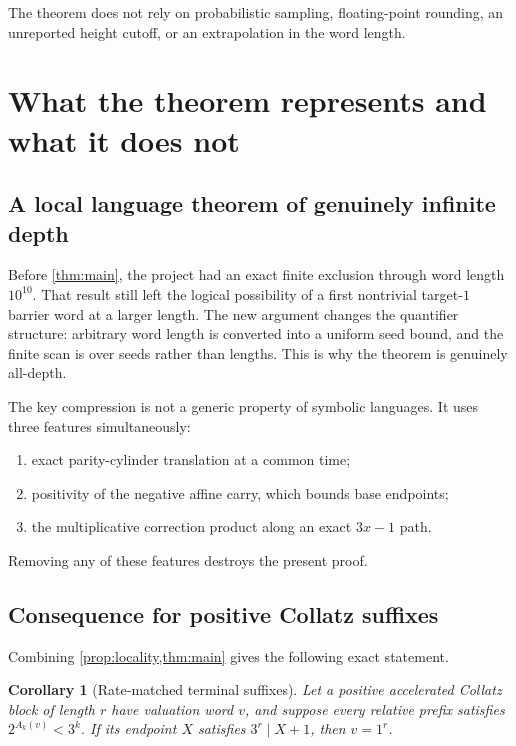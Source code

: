 \documentclass[11pt]{article}
\newtheorem{corollary}[theorem]{Corollary}
\theoremstyle{definition}
\theoremstyle{remark}
\begin{document}
The theorem does not rely on probabilistic sampling, floating-point
rounding, an unreported height cutoff, or an extrapolation in the word
length.

\section{What the theorem represents and what it does not}\label{sec:meaning}

\subsection{A local language theorem of genuinely infinite depth}

Before \cref{thm:main}, the project had an exact finite exclusion through
word length $10^{10}$.  That result still left the logical possibility of a
first nontrivial target-$1$ barrier word at a larger length.  The new argument
changes the quantifier structure: arbitrary word length is converted into a
uniform seed bound, and the finite scan is over seeds rather than lengths.
This is why the theorem is genuinely all-depth.

The key compression is not a generic property of symbolic languages.  It
uses three features simultaneously:
\begin{enumerate}[label=\textup{(\alph*)}]
\item exact parity-cylinder translation at a common time;
\item positivity of the negative affine carry, which bounds base endpoints;
\item the multiplicative correction product along an exact $3x-1$ path.
\end{enumerate}
Removing any of these features destroys the present proof.

\subsection{Consequence for positive Collatz suffixes}

Combining \cref{prop:locality,thm:main} gives the following exact statement.

\begin{corollary}[Rate-matched terminal suffixes]\label{cor:positive-suffix}
Let a positive accelerated Collatz block of length $r$ have valuation word
$v$, and suppose every relative prefix satisfies
$2^{A_k(v)}<3^k$.  If its endpoint $X$ satisfies
$3^r\mid X+1$, then $v=1^r$.
\end{corollary}
\end{document}
